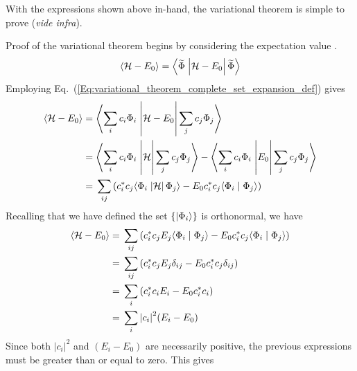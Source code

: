 With the expressions shown above in-hand, the variational theorem is simple to prove (\emph{vide infra}).

\begin{hphproof} 
%
Proof of the variational theorem begins by considering the expectation value . 
%
\begin{equation*}
  \displaystyle
    \expect{\mathcal{H}-E_0} = \braketop{\widetilde{\Phi}}{\mathcal{H}-E_0}{\widetilde{\Phi}}
\end{equation*}
%
Employing Eq.~(\ref{Eq:variational_theorem_complete_set_expansion_def}) gives
%
\begin{equation*}
  \displaystyle
  \begin{split}
    \expect{\mathcal{H}-E_0} ={}& \braketop{\sum_i{c_i \Phi_i}}{\mathcal{H}-E_0}{\sum_j{c_j \Phi_j}}   \\
      ={}& \braketop{\sum_i{c_i \Phi_i}}{\mathcal{H}}{\sum_j{c_j \Phi_j}}
        - \braketop{\sum_i{c_i \Phi_i}}{E_0}{\sum_j{c_j \Phi_j}}   \\
      ={}& \sum_{ij}{\left(
        c_i^* c_j \braketop{\Phi_i}{\mathcal{H}}{\Phi_j} - E_0 c_i^* c_j \braket{\Phi_i}{\Phi_j}
        \right)}  \\
  \end{split}
\end{equation*}
%
Recalling that we have defined the set $\{\ket{\Phi_i}\}$ is orthonormal, we have
%
\begin{equation*}
  \displaystyle
  \begin{split}
    \expect{\mathcal{H}-E_0}
      ={}& \sum_{ij}{\left(
        c_i^* c_j E_j \braket{\Phi_i}{\Phi_j} - E_0 c_i^* c_j \braket{\Phi_i}{\Phi_j}
        \right)}  \\
      ={}& \sum_{ij}{\left(
        c_i^* c_j E_j \delta_{ij} - E_0 c_i^* c_j \delta_{ij}
        \right)}  \\
      ={}& \sum_{i}{\left(
        c_i^* c_i E_i - E_0 c_i^* c_i
        \right)}  \\
      ={}& \sum_{i}{
        \left| c_i \right|^2 \left( E_i - E_0 \right)}  \\
  \end{split}
\end{equation*}
%
Since both $\left| c_i \right|^2$ and $(E_i - E_0)$ are necessarily positive, the previous expressions must be greater than or equal to zero. This gives
%
\begin{equation*}
  \displaystyle
  \begin{split}

\end{split}
\end{equation*}
\end{hphproof}
